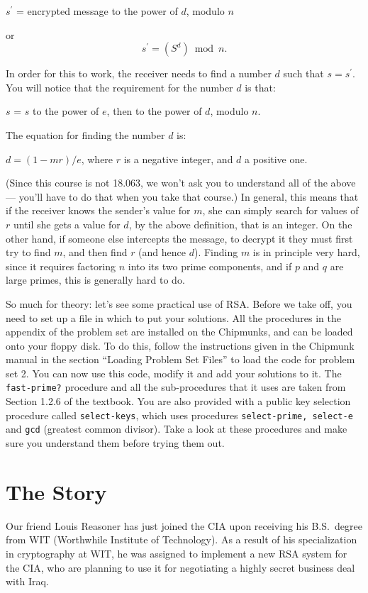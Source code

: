 \smallskip
\centerline{$s^\prime$ = encrypted message to the power of $d$, modulo
$n$}
or
\[s^\prime = (S^d) \bmod n.\]

In order for this to work, the receiver needs to find a number $d$ such
that $s = s^\prime$.  You will notice that the requirement for the
number $d$ is that:   

\centerline{$s$ = $s$ to the power of $e$, then to the power of $d$, modulo
$n$.}

The equation for finding the number $d$ is:

\centerline{$d = (1 - mr)/e$, where $r$ is a negative integer, and $d$ a positive one.}

(Since this course is not 18.063, we won't ask you to understand all of the
above --- you'll have to do that when you take that course.)  In
general, this means that if the receiver knows the sender's value for
$m$, she can simply search for values of $r$ until she gets a value
for $d$, by the above definition, that is an integer.  On the other
hand, if someone else intercepts the message, to decrypt it they must
first try to find $m$, and then find $r$ (and hence $d$).  Finding $m$ is
in principle very hard, since it requires factoring $n$ into its two
prime components, and if $p$ and $q$ are large primes, this is
generally hard to do.

So much for theory: let's see some practical use of RSA.  Before we take
off, you need to set up a file in which to put your solutions.  All the
procedures in the appendix of the problem set are installed on the
Chipmunks, and can be loaded onto your floppy disk.  To do this,
follow the instructions given in the Chipmunk manual in the section
``Loading Problem Set Files'' to load the code for problem set 2.
You can now use this code, modify it and add your solutions to it.
The {\tt fast-prime?} procedure and all the sub-procedures that it uses
are taken from Section 1.2.6 of the textbook. You are also provided with a
public key selection procedure called {\tt select-keys}, which uses
procedures
{\tt select-prime, select-e} and {\tt gcd} (greatest common divisor). 
Take a look at
these procedures and make sure you understand them before trying them out.

\section{The Story}

Our friend Louis Reasoner has just joined the CIA upon receiving his
B.S.\ degree from WIT (Worthwhile Institute of Technology).  As a result of
his specialization in cryptography at WIT, he was assigned to implement a
new RSA system for the CIA, who are planning to use it for negotiating a
highly secret business deal with Iraq.


